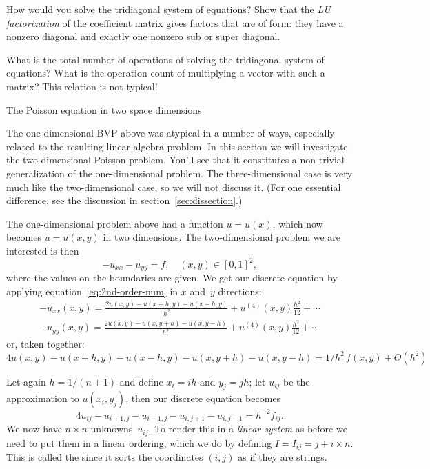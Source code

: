 \begin{exercise}
  \label{ex:solve-tri}
  How would you solve the tridiagonal
  system of equations?
  Show that the \emph{LU factorization}%
  of the coefficient matrix gives factors that are of
   form: they have a nonzero diagonal
  and exactly one nonzero sub or super diagonal.

  What is the total number of operations of solving the tridiagonal
  system of equations? What is the operation count of multiplying a
  vector with
  such a matrix? This relation is not typical!
\end{exercise}

 {The Poisson equation in two space dimensions}
\label{sec:2dbvp}

The one-dimensional \ac{BVP} above was atypical in a number of ways,
especially related to the resulting linear algebra problem. In this
section we will investigate the two-dimensional Poisson problem.
You'll see that it constitutes a non-trivial generalization of the one-dimensional problem.
The three-dimensional case is very much like the two-dimensional case,
so we will not discuss it. (For one essential difference, see the discussion
in section~\ref{sec:dissection}.)

The one-dimensional problem above had a function $u=u(x)$, which now becomes
$u=u(x,y)$ in two dimensions. 
The two-dimensional problem we are interested is then
\begin{equation} -u_{xx}-u_{yy} = f,\quad (x,y)\in[0,1]^2,
  \label{eq:laplace}
\end{equation}
where the values on the boundaries are given. We get our discrete
equation by applying equation~\eqref{eq:2nd-order-num} in $x$ and~$y$
directions:
\begin{equation}
\begin{array}{l}
  -u_{xx}(x,y)=\frac{2u(x,y)-u(x+h,y)-u(x-h,y)}{h^2}+u^{(4)}(x,y)\frac{h^2}{12}+\cdots\\
  -u_{yy}(x,y)=\frac{2u(x,y)-u(x,y+h)-u(x,y-h)}{h^2}+u^{(4)}(x,y)\frac{h^2}{12}+\cdots
\end{array}
\end{equation}
or, taken together:
\begin{equation}
  4u(x,y)-u(x+h,y)-u(x-h,y)-u(x,y+h)-u(x,y-h)=1/h^2\,f(x,y)+O(h^2)
  \label{eq:5-point-star}
\end{equation}

Let again $h=1/(n+1)$ and
define $x_i=ih$ and $y_j=jh$; let $u_{ij}$ be the approximation to
$u(x_i,y_j)$, then
our discrete equation becomes
\begin{equation}
  4u_{ij}-u_{i+1,j}-u_{i-1,j}-u_{i,j+1}-u_{i,j-1}=h^{-2}f_{ij}.
  \label{eq:5-point-star-ij}
\end{equation}
We now have $n\times n$ unknowns~$u_{ij}$. To render this in a
%
\emph{linear system}
%
as before we need to put them in a linear ordering, which we do
by defining $I=I_{ij}=j+i\times n$. This is called the
 since it sorts the coordinates
$(i,j)$ as if they are strings.

